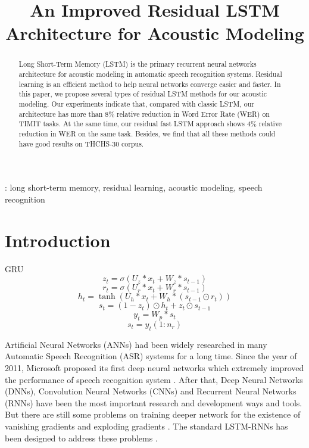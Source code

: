 \documentclass[a4paper]{article}
\title{An Improved Residual LSTM Architecture for Acoustic Modeling}
\begin{document}
  \maketitle
  \begin{abstract}
Long Short-Term Memory (LSTM) is the primary recurrent neural networks architecture for acoustic modeling in automatic speech recognition systems.
Residual learning is an efficient method to help neural networks converge easier and faster.
In this paper, we propose several types of residual LSTM  methods for our acoustic modeling.
Our experiments indicate that, compared with classic LSTM, our architecture has more than 8\% relative reduction in Word Error Rate (WER) on TIMIT tasks.
At the same time, our residual fast LSTM approach shows 4\% relative reduction in WER on the same task.
Besides, we find that all these methods could have good results on THCHS-30 corpus.
  \end{abstract}
  : long short-term memory, residual learning, acoustic modeling, speech recognition



  \section{Introduction}

GRU 
\begin{equation}
z_t = \sigma ( U_z*x_t + W_z*s_{t-1} ) 
\end{equation}
\begin{equation}
r_t = \sigma (U_r* x_t   + W_r*s_{t-1}  )
\end{equation}
\begin{equation}
h_t = \tanh ( U_h*x_t  + W_h*(s_{t-1} \odot r_t) )
\end{equation}
\begin{equation}
s_t = ( 1 - z_t ) \odot h_t + z_t \odot s_{t-1}
\end{equation}
\begin{equation}
y_t=W_{p}*s_t
\end{equation}
\begin{equation}
s_t={y_t}(1:n_r)
\end{equation}



Artificial Neural Networks (ANNs) had been widely researched in many Automatic Speech Recognition (ASR) systems for a long time.
Since the year of 2011, Microsoft proposed its first deep neural networks which extremely improved the performance of speech recognition system \cite{ms-dnn}.
After that, Deep Neural Networks (DNNs), Convolution Neural Networks (CNNs) and Recurrent Neural Networks (RNNs) have been the most important research and development ways and tools.
But there are still some problems on training deeper network for the existence of vanishing gradients and exploding gradients \cite{gradient}.
The standard LSTM-RNNs \cite{lstm} has been designed to address these problems \cite{lstm-asr}.
\end{document}
